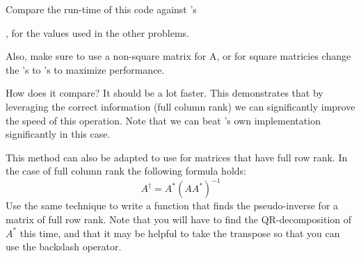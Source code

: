 \begin{problem}
Compare the run-time of this code against \ProgrammingLanguage's \begin{matlab}\end{matlab}\begin{python}\end{python}, for the values used in the other problems. \begin{python}Also, make sure to use a non-square matrix for A, or for square matricies change the 's to 's to maximize performance.\end{python}How does it compare? It should be a lot faster. This demonstrates that by leveraging the correct information (full column rank) we can significantly improve the speed of this operation. Note that we can beat \ProgrammingLanguage's own implementation significantly in this case.

\end{problem}

\begin{problem}
This method can also be adapted to use for matrices that have full row rank. In the case of full column rank the following formula holds:
\[
A^\dagger = A^*(A A^*)^{-1}
\]
Use the same technique to write a function that finds the pseudo-inverse for a matrix of full row rank. Note that you will have to find the QR-decomposition of $A^*$ this time, and that it may be helpful to take the transpose so that you can use the backslash operator.
\end{problem}
